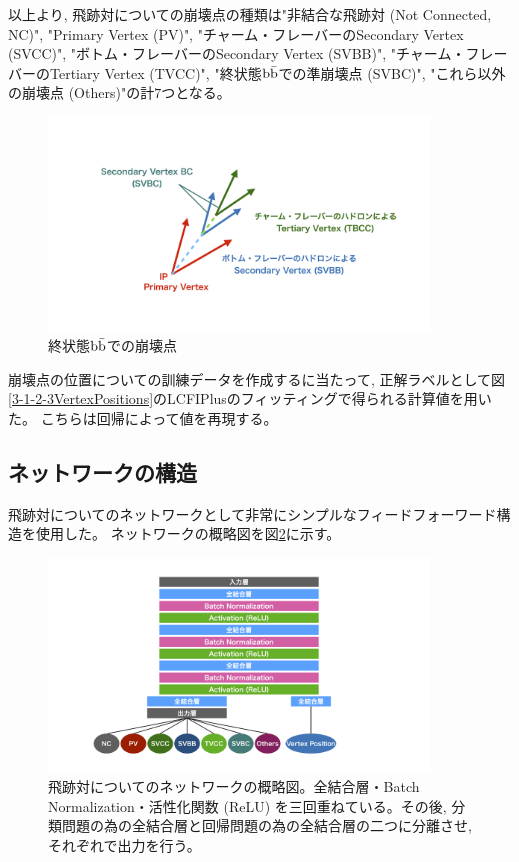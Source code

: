以上より, 飛跡対についての崩壊点の種類は"非結合な飛跡対 (Not Connected, NC)", "Primary Vertex (PV)", "チャーム・フレーバーのSecondary Vertex (SVCC)", "ボトム・フレーバーのSecondary Vertex (SVBB)", "チャーム・フレーバーのTertiary Vertex (TVCC)", "終状態$\rm b\bar{b}$での準崩壊点 (SVBC)", "これら以外の崩壊点 (Others)"の計$7$つとなる。

\begin{figure}[htbp]
 \centering
 \includegraphics[trim = 200 150 200 150, width=0.9\textwidth, clip]{Figure/3Networks/3-3-0-1SecondaryVertexBC.png}
 \caption{終状態$\rm b\bar{b}$での崩壊点}
 \label{3-3-0-1SecondaryVertexBC}
\end{figure}

崩壊点の位置についての訓練データを作成するに当たって, 正解ラベルとして図\ref{3-1-2-3VertexPositions}のLCFIPlusのフィッティングで得られる計算値を用いた。
こちらは回帰によって値を再現する。


\subsection{ネットワークの構造} \label{Net:PM:StructureofPM}

飛跡対についてのネットワークとして非常にシンプルなフィードフォーワード構造を使用した。
ネットワークの概略図を図\ref{3-3-1-1PairModel}に示す。

\begin{figure}[htbp]
 \centering
 \includegraphics[trim = 200 50 200 50, width=0.9\textwidth, clip]{Figure/3Networks/3-3-1-1PairModel.png}
 \caption[飛跡対についてのネットワークの概略図]{飛跡対についてのネットワークの概略図。全結合層・Batch Normalization・活性化関数 (ReLU) を三回重ねている。その後, 分類問題の為の全結合層と回帰問題の為の全結合層の二つに分離させ, それぞれで出力を行う。}
 \label{3-3-1-1PairModel}
\end{figure}

